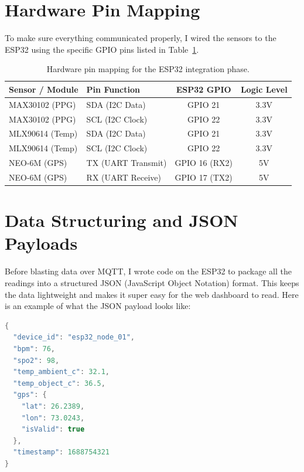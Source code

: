 \documentclass[12pt,a4paper,oneside]{report}
\begin{document}
\section{Hardware Pin Mapping}
To make sure everything communicated properly, I wired the sensors to the ESP32 using the specific GPIO pins listed in Table~\ref{tab:esp32_pins}.

\begin{table}[H]
\centering
\begin{tabular}{@{}llcc@{}}
\toprule
\textbf{Sensor / Module} & \textbf{Pin Function} & \textbf{ESP32 GPIO} & \textbf{Logic Level} \\ \midrule
MAX30102 (PPG)           & SDA (I2C Data)        & GPIO 21             & 3.3V                 \\
MAX30102 (PPG)           & SCL (I2C Clock)       & GPIO 22             & 3.3V                 \\
MLX90614 (Temp)          & SDA (I2C Data)        & GPIO 21             & 3.3V                 \\
MLX90614 (Temp)          & SCL (I2C Clock)       & GPIO 22             & 3.3V                 \\
NEO-6M (GPS)             & TX (UART Transmit)    & GPIO 16 (RX2)       & 5V\\
NEO-6M (GPS)             & RX (UART Receive)     & GPIO 17 (TX2)       & 5V\\ \bottomrule
\end{tabular}
\caption{Hardware pin mapping for the ESP32 integration phase.}
\label{tab:esp32_pins}
\end{table}

\section{Data Structuring and JSON Payloads}
Before blasting data over MQTT, I wrote code on the ESP32 to package all the readings into a structured JSON (JavaScript Object Notation) format. This keeps the data lightweight and makes it super easy for the web dashboard to read. Here is an example of what the JSON payload looks like:

\begin{lstlisting}[language=java, caption=Example JSON telemetry payload sent to the cloud.]
{
  "device_id": "esp32_node_01",
  "bpm": 76,
  "spo2": 98,
  "temp_ambient_c": 32.1,
  "temp_object_c": 36.5,
  "gps": {
    "lat": 26.2389,
    "lon": 73.0243,
    "isValid": true
  },
  "timestamp": 1688754321
}
\end{lstlisting}
\end{document}
